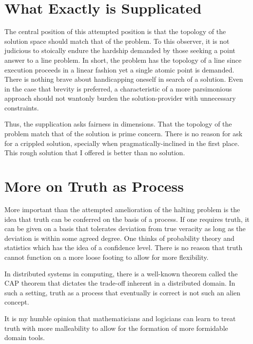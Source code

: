 \documentclass[11pt]{article}
\begin{document}
\section{What Exactly is Supplicated}
\label{sec:orgbaadb6e}

The central position of this attempted position is that the topology of the
solution space should match that of the problem. To this observer, it is not
judicious to stoically endure the hardship demanded by those seeking a point
answer to a line problem. In short, the problem has the topology of a line
since execution proceeds in a linear fashion yet a single atomic point is
demanded. There is nothing brave about handicapping oneself in search of a
solution. Even in the case that brevity is preferred, a characteristic of a
more parsimonious approach should not wantonly burden the solution-provider
with unnecessary constraints.

Thus, the supplication asks fairness in dimensions. That the topology of the
problem match that of the solution is prime concern. There is no reason for
ask for a crippled solution, specially when pragmatically-inclined in the
first place. This rough solution that I offered is better than no solution.

\section{More on Truth as Process}
\label{sec:org417135b}
More important than the attempted amelioration of the halting problem is the
idea that truth can be conferred on the basis of a process. If one requires
truth, it can be given on a basis that tolerates deviation from true veracity
as long as the deviation is within some agreed degree. One thinks of
probability theory and statistics which has the idea of a confidence level.
There is no reason that truth cannot function on a more loose footing to allow
for more flexibility.

In distributed systems in computing, there is a well-known theorem called the
CAP theorem that dictates the trade-off inherent in a distributed domain. In
such a setting, truth as a process that eventually is correct is not such an
alien concept.

It is my humble opinion that mathematicians and logicians can learn to treat
truth with more malleability to allow for the formation of more formidable
domain tools.
\end{document}
